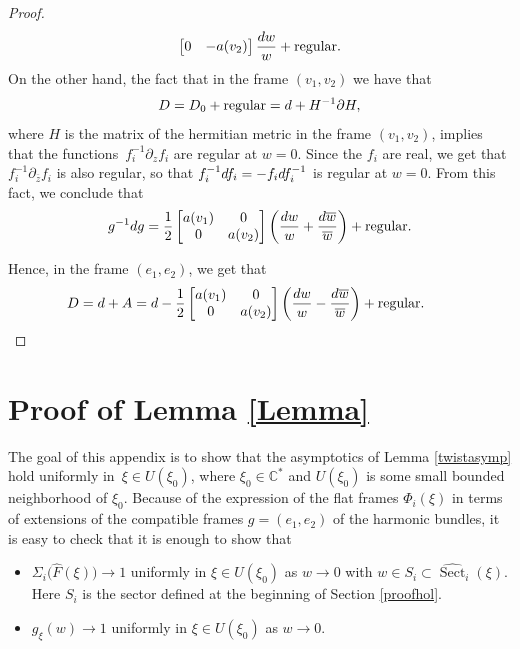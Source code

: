 \documentclass[11pt]{article}
\numberwithin{equation}{section}
\numberwithin{equation}{section}
\begin{document}
\begin{proof}
\begin{equation*}
\begin{bmatrix}
 0 & -a(v_2) \\
 \end{bmatrix}\frac{{\rm d}w}{w}+\text{regular}.
\end{equation*}
On the other hand, the fact that in the frame $(v_1,v_2)$ we have that
\begin{equation*}
 D=D_0 +\text{regular}= {\rm d} + H^{-1}\partial H,
\end{equation*}
where $H$ is the matrix of the hermitian metric in the frame $(v_1,v_2)$,
implies that the functions~${f_i^{-1}\partial_{z} f_i}$ are regular at $w=0$. Since the $f_i$ are real, we get that $f_i^{-1}\partial_{\overline{z}}f_i$ is also regular, so that $f_i^{-1}{\rm d}f_i=-f_i{\rm d}f_i^{-1}$ is regular at $w=0$. From this fact, we conclude that
\begin{equation*}
 g^{-1}dg= \frac{1}{2}\begin{bmatrix} a(v_1) & 0 \\
 0 & a(v_2) \\
 \end{bmatrix}\left(\frac{{\rm d}w}{w}+ \frac{{\rm d}\overline{w}}{\overline{w}}\right) + \text{regular}.
\end{equation*}

Hence, in the frame $(e_1,e_2)$, we get that
\begin{equation*}
 D={\rm d}+A={\rm d} - \frac{1}{2}\begin{bmatrix} a(v_1) & 0 \\
 0 & a(v_2) \\
 \end{bmatrix}\left(\frac{{\rm d}w}{w}- \frac{{\rm d}\overline{w}}{\overline{w}}\right) + \text{regular}.\tag*{\qed}
\end{equation*} \renewcommand{\qed}{}
\end{proof}

\section{Proof of Lemma \ref{Lemma}}\label{AC}

The goal of this appendix is to show that the asymptotics of Lemma \ref{twistasymp} hold uniformly in~${\xi \in U(\xi_0)}$, where $\xi_0 \in \mathbb{C}^*$ and $U(\xi_0)$ is some small bounded neighborhood of $\xi_0$. Because of the expression of the flat frames $\Phi_i(\xi)$ in terms of extensions of the compatible frames $g=(e_1,e_2)$ of the harmonic bundles, it is easy to check that it is enough to show that
\begin{itemize}\itemsep=0pt
 \item $\Sigma_i\bigl(\widehat{F}(\xi)\bigr) \to 1$ uniformly in $\xi \in U(\xi_0)$ as $w\to 0$ with $w\in S_i \subset \widehat{\operatorname{Sect}}_i(\xi)$. Here $S_i$ is the sector defined at the beginning of Section \ref{proofhol}.
 \item $g_{\xi}(w)\to 1$ uniformly in $\xi \in U(\xi_0)$ as $w\to 0$.
\end{itemize}
\end{document}
